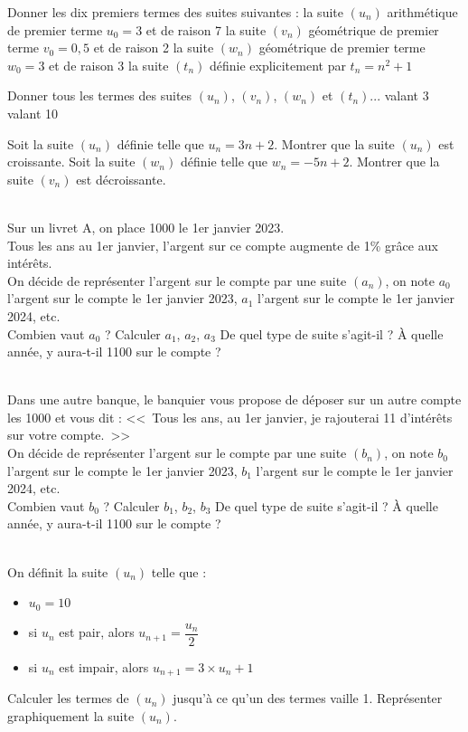\documentclass[11pt]{memoir}
\begin{document}
\begin{questions}

\exercice 
\question Donner les dix premiers termes des suites suivantes :
\subpart la suite $(u_n)$ arithmétique de premier terme $u_0 = 3$ et de raison 7
\subpart la suite $(v_n)$ géométrique de premier terme $v_0 = 0,5$ et de raison 2
\subpart la suite $(w_n)$ géométrique de premier terme $w_0 = 3$ et de raison 3
\subpart la suite $(t_n)$ définie explicitement par $t_n = n^2+1$

\question Donner tous les termes des suites $(u_n)$, $(v_n)$, $(w_n)$ et $(t_n)$...
\subpart valant 3
\subpart valant 10

\exercice
\question Soit la suite $(u_n)$ définie telle que $u_n = 3n+2$. Montrer que la suite $(u_n)$ est croissante.
\question Soit la suite $(w_n)$ définie telle que $w_n = -5n+2$. Montrer que la suite $(v_n)$ est décroissante.

\exercice \\
Sur un livret A, on place \qty{1000}{\text{\euro}} le 1er janvier 2023.\\
Tous les ans au 1er janvier, l'argent sur ce compte augmente de 1\% grâce aux intérêts.\\

On décide de représenter l'argent sur le compte par une suite $(a_n)$, on note $a_0$ l'argent sur le compte le 1er janvier 2023, $a_1$ l'argent sur le compte le 1er janvier 2024, etc.\\

\question Combien vaut $a_0$ ?
\question Calculer $a_1$, $a_2$, $a_3$
\question De quel type de suite s'agit-il ?
\question À quelle année, y aura-t-il \qty{1100}{\text{\euro}} sur le compte ?

\exercice \\
Dans une autre banque, le banquier vous propose de déposer sur un autre compte les \qty{1000}{\text{\euro}} et vous dit : <<~Tous les ans, au 1er janvier, je rajouterai \qty{11}{\text{\euro}} d'intérêts sur votre compte.~>>\\

On décide de représenter l'argent sur le compte par une suite $(b_n)$, on note $b_0$ l'argent sur le compte le 1er janvier 2023, $b_1$ l'argent sur le compte le 1er janvier 2024, etc.\\

\question Combien vaut $b_0$ ?
\question Calculer $b_1$, $b_2$, $b_3$
\question De quel type de suite s'agit-il ?
\question À quelle année, y aura-t-il \qty{1100}{\text{\euro}} sur le compte ?

\exercice \\
On définit la suite $(u_n)$ telle que :
\begin{itemize}
    \item $u_0 = 10$
    \item si $u_n$ est pair, alors $u_{n+1} = \dfrac{u_n}{2}$
    \item si $u_n$ est impair, alors $u_{n+1} = 3\times u_n + 1$
\end{itemize}

\question Calculer les termes de $(u_n)$ jusqu'à ce qu'un des termes vaille 1.
\question Représenter graphiquement la suite $(u_n)$.


\end{questions}
\end{document}
